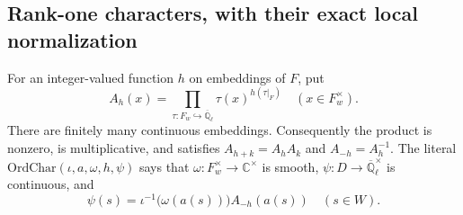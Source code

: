 \documentclass[11pt,a4paper]{article}
\numberwithin{equation}{section}
\theoremstyle{remark}\newtheorem{remark}[theorem]{Remark}
\begin{document}
\subsection{Rank-one characters, with their exact local normalization}

For an integer-valued function \(h\) on embeddings of \(F\), put
\[
 A_h(x)=\prod_{\tau:F_w\hookrightarrow\overline{\mathbb Q}_\ell}
       \tau(x)^{h(\tau|_F)}\quad(x\in F_w^\times).
 \tag{OFL.2}
\]
There are finitely many continuous embeddings.  Consequently the
product is nonzero, is multiplicative, and satisfies
\(A_{h+k}=A_hA_k\) and \(A_{-h}=A_h^{-1}\).
The literal \(\mathrm{OrdChar}(\iota,a,\omega,h,\psi)\)
says that \(\omega:F_w^\times\to\mathbb C^\times\) is smooth,
\(\psi:D\to\overline{\mathbb Q}_\ell^\times\) is continuous, and
\[
       \psi(s)=\iota^{-1}\bigl(\omega(a(s))\bigr)A_{-h}(a(s))
                         \quad(s\in W).
 \tag{OFL.3}
\]

\end{document}
